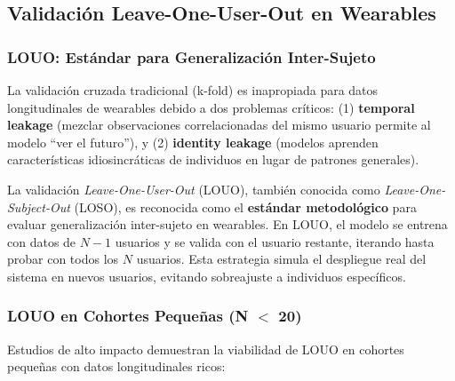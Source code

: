 \subsection{Validación Leave-One-User-Out en Wearables}
\label{subsec:louo_wearables}

\subsubsection{LOUO: Estándar para Generalización Inter-Sujeto}
\label{subsubsec:louo_estandar}

La validación cruzada tradicional (k-fold) es inapropiada para datos longitudinales de wearables debido a dos problemas críticos: (1) \textbf{temporal leakage} (mezclar observaciones correlacionadas del mismo usuario permite al modelo ``ver el futuro''), y (2) \textbf{identity leakage} (modelos aprenden características idiosincráticas de individuos en lugar de patrones generales).

La validación \textit{Leave-One-User-Out} (LOUO), también conocida como \textit{Leave-One-Subject-Out} (LOSO), es reconocida como el \textbf{estándar metodológico} para evaluar generalización inter-sujeto en wearables. En LOUO, el modelo se entrena con datos de $N-1$ usuarios y se valida con el usuario restante, iterando hasta probar con todos los $N$ usuarios. Esta estrategia simula el despliegue real del sistema en nuevos usuarios, evitando sobreajuste a individuos específicos.

\subsubsection{LOUO en Cohortes Pequeñas (N $<$ 20)}
\label{subsubsec:louo_cohortes_pequenas}

Estudios de alto impacto demuestran la viabilidad de LOUO en cohortes pequeñas con datos longitudinales ricos:

